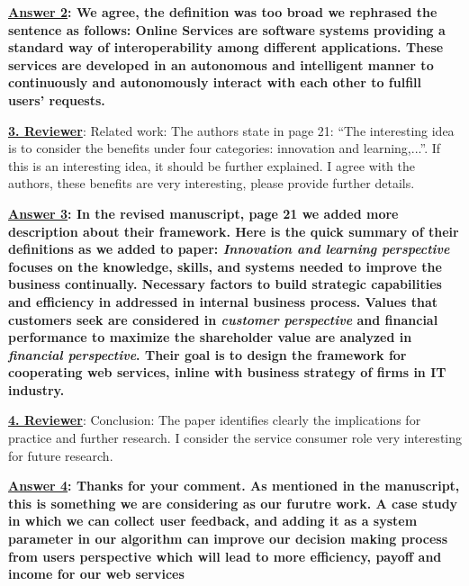 \documentclass[times, 12pt,a4paper]{article}
\begin{document}
\vspace{0.2cm}\textbf{\underline{Answer 2}: We agree, the definition was too broad we rephrased
the sentence as follows: Online Services are software systems providing a standard way of
interoperability among different applications. These services are developed
 in an autonomous and intelligent manner to continuously and autonomously interact with each other to
fulfill users' requests.}

\vspace{0.5cm} \textbf{\underline{3. Reviewer}}: Related work: The authors state in page 21: ``The interesting idea is to consider the benefits under four categories: innovation and learning,...''. If this is an interesting idea, it should be further explained. I agree with the authors, these benefits are very interesting, please provide further details.

\vspace{0.2cm}\textbf{\underline{Answer 3}: In the revised manuscript, page 21 we added more description about their framework. Here is the quick summary of their definitions as we added to paper: \emph{Innovation and learning perspective} focuses on the knowledge, skills, and systems needed to improve the business continually. Necessary factors to build strategic capabilities and efficiency in addressed in internal business process. Values that customers seek are considered in \emph{customer perspective} and financial performance to maximize the shareholder value are analyzed in \emph{financial perspective}. Their goal is to design the framework for cooperating web services, inline with business strategy of firms in IT industry.}


\vspace{0.5cm} \textbf{\underline{4. Reviewer}}:  Conclusion: The paper identifies clearly the implications for practice and further research. I consider the service consumer role very interesting for future research.

\vspace{0.2cm}\textbf{\underline{Answer 4}: Thanks for your comment. As mentioned in the manuscript, this is something we are considering as our furutre work. A case study in which we can collect user feedback, and adding it as a system parameter in our algorithm can improve our decision making process from users perspective which will lead to more efficiency, payoff and income for our web services}
\end{document}
